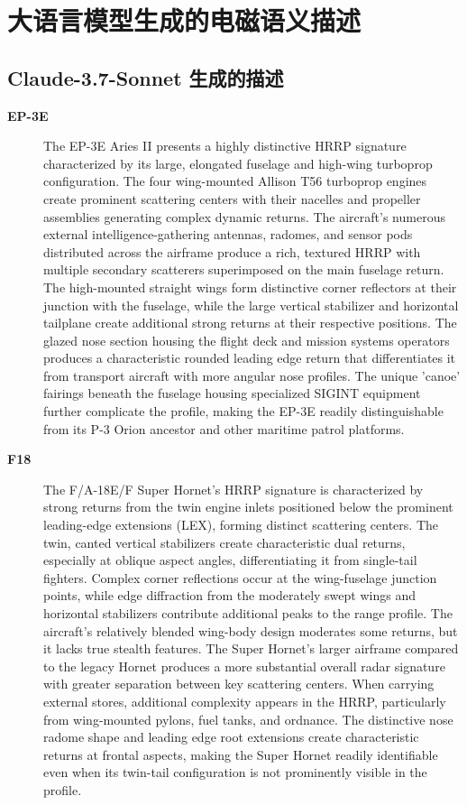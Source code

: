 \chapter{大语言模型生成的电磁语义描述}
\label{chap:llmsem}
\section{Claude-3.7-Sonnet 生成的描述}
\label{sec:claude_desc}
\footnotesize
{\begin{description} %
    \item[\textbf{EP-3E}]
    {The EP-3E Aries II presents a highly distinctive HRRP signature characterized by its large, elongated fuselage and high-wing turboprop configuration. The four wing-mounted Allison T56 turboprop engines create prominent scattering centers with their nacelles and propeller assemblies generating complex dynamic returns. The aircraft's numerous external intelligence-gathering antennas, radomes, and sensor pods distributed across the airframe produce a rich, textured HRRP with multiple secondary scatterers superimposed on the main fuselage return. The high-mounted straight wings form distinctive corner reflectors at their junction with the fuselage, while the large vertical stabilizer and horizontal tailplane create additional strong returns at their respective positions. The glazed nose section housing the flight deck and mission systems operators produces a characteristic rounded leading edge return that differentiates it from transport aircraft with more angular nose profiles. The unique 'canoe' fairings beneath the fuselage housing specialized SIGINT equipment further complicate the profile, making the EP-3E readily distinguishable from its P-3 Orion ancestor and other maritime patrol platforms.}

    \item[\textbf{F18}] %
    The F/A-18E/F Super Hornet's HRRP signature is characterized by strong returns from the twin engine inlets positioned below the prominent leading-edge extensions (LEX), forming distinct scattering centers. The twin, canted vertical stabilizers create characteristic dual returns, especially at oblique aspect angles, differentiating it from single-tail fighters. Complex corner reflections occur at the wing-fuselage junction points, while edge diffraction from the moderately swept wings and horizontal stabilizers contribute additional peaks to the range profile. The aircraft's relatively blended wing-body design moderates some returns, but it lacks true stealth features. The Super Hornet's larger airframe compared to the legacy Hornet produces a more substantial overall radar signature with greater separation between key scattering centers. When carrying external stores, additional complexity appears in the HRRP, particularly from wing-mounted pylons, fuel tanks, and ordnance. The distinctive nose radome shape and leading edge root extensions create characteristic returns at frontal aspects, making the Super Hornet readily identifiable even when its twin-tail configuration is not prominently visible in the profile.


\end{description}}

